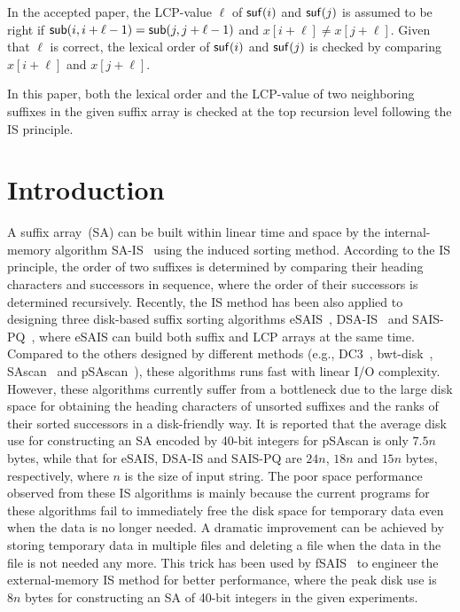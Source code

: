 \documentclass[10pt,journal,compsoc]{IEEEtran}
\begin{document}
\maketitle

\IEEEdisplaynontitleabstractindextext

\IEEEpeerreviewmaketitle

{\color{red}

In the accepted paper, the LCP-value $\ell$ of ${\sf suf}(i)$ and ${\sf suf}(j)$ is assumed to be right if ${\sf sub}(i, i + \ell - 1) = {\sf sub}(j, j + \ell - 1)$ and $x[i + \ell] \ne x[j + \ell]$. Given that $\ell$ is correct, the lexical order of ${\sf suf}(i)$ and ${\sf suf}(j)$ is checked by comparing $x[i + \ell]$ and $x[j + \ell]$.  

In this paper, both the lexical order and the LCP-value of two neighboring suffixes in the given suffix array is checked at the top recursion level following the IS principle. 

}

\section{Introduction}\label{sec:introduction}

A suffix array~(SA) can be built within linear time and space by the internal-memory algorithm SA-IS~\cite{Nong11} using the induced sorting method. According to the IS principle, the order of two suffixes is determined by comparing their heading characters and successors in sequence, where the order of their successors is determined recursively. Recently, the IS method has been also applied to designing three disk-based suffix sorting algorithms eSAIS~\cite{Bingmann12}, DSA-IS~\cite{Nong15} and SAIS-PQ~\cite{Liu15}, where eSAIS can build both suffix and LCP arrays at the same time. Compared to the others designed by different methods (e.g., DC3~\cite{Dementiev2008a}, bwt-disk~\cite{Ferragina2012}, SAscan~\cite{Karkkainen2014} and pSAscan~\cite{Karkkainen2015}), these algorithms runs fast with linear I/O complexity. However, these algorithms currently suffer from a bottleneck due to the large disk space for obtaining the heading characters of unsorted suffixes and the ranks of their sorted successors in a disk-friendly way. It is reported that the average disk use for constructing an SA encoded by 40-bit integers for pSAscan is only $7.5n$ bytes, while that for eSAIS, DSA-IS and SAIS-PQ are $24n$, $18n$ and $15n$ bytes, respectively, where $n$ is the size of input string. The poor space performance observed from these IS algorithms is mainly because the current programs for these algorithms fail to immediately free the disk space for temporary data even when the data is no longer needed. A dramatic improvement can be achieved by storing temporary data in multiple files and deleting a file when the data in the file is not needed any more. This trick has been used by fSAIS~\cite{Karkkainen2017} to engineer the external-memory IS method for better performance, where the peak disk use is $8n$ bytes for constructing an SA of 40-bit integers in the given experiments.
\end{document}
